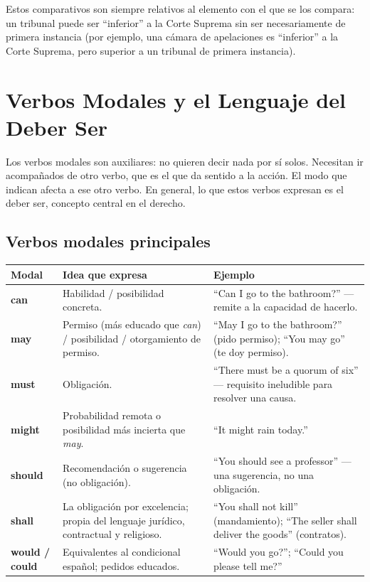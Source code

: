\documentclass[12pt,oneside]{book}
\begin{document}
Estos comparativos son siempre relativos al elemento con el que se los compara: un tribunal puede ser ``inferior'' a la Corte Suprema sin ser necesariamente de primera instancia (por ejemplo, una cámara de apelaciones es ``inferior'' a la Corte Suprema, pero superior a un tribunal de primera instancia).

\section{Verbos Modales y el Lenguaje del Deber Ser}

Los verbos modales son auxiliares: no quieren decir nada por sí solos. Necesitan ir acompañados de otro verbo, que es el que da sentido a la acción. El modo que indican afecta a ese otro verbo. En general, lo que estos verbos expresan es el deber ser, concepto central en el derecho.

\subsection*{Verbos modales principales}

\begin{table}[H]
\centering
\begin{tabularx}{\textwidth}{p{2.5cm} X p{4.5cm}}
\toprule
\textbf{Modal} & \textbf{Idea que expresa} & \textbf{Ejemplo} \\
\midrule
\textbf{can} & Habilidad / posibilidad concreta. & ``Can I go to the bathroom?'' --- remite a la capacidad de hacerlo. \\
\midrule
\textbf{may} & Permiso (más educado que \textit{can}) / posibilidad / otorgamiento de permiso. & ``May I go to the bathroom?'' (pido permiso); ``You may go'' (te doy permiso). \\
\midrule
\textbf{must} & Obligación. & ``There must be a quorum of six'' --- requisito ineludible para resolver una causa. \\
\midrule
\textbf{might} & Probabilidad remota o posibilidad más incierta que \textit{may}. & ``It might rain today.'' \\
\midrule
\textbf{should} & Recomendación o sugerencia (no obligación). & ``You should see a professor'' --- una sugerencia, no una obligación. \\
\midrule
\textbf{shall} & La obligación por excelencia; propia del lenguaje jurídico, contractual y religioso. & ``You shall not kill'' (mandamiento); ``The seller shall deliver the goods'' (contratos). \\
\midrule
\textbf{would / could} & Equivalentes al condicional español; pedidos educados. & ``Would you go?''; ``Could you please tell me?'' \\
\bottomrule
\end{tabularx}
\end{table}
\end{document}

